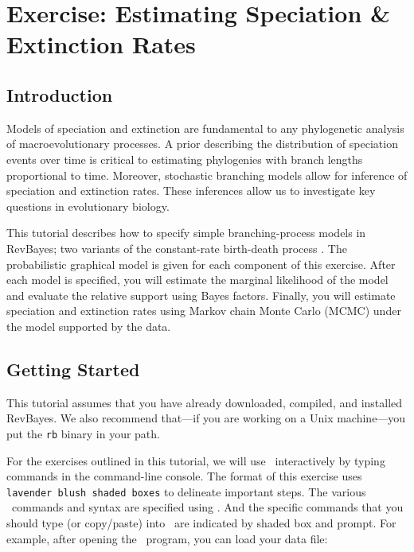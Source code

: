 \section{Exercise: Estimating Speciation \& Extinction Rates}

\subsection{Introduction}

Models of speciation and extinction are fundamental to any phylogenetic analysis of macroevolutionary processes.
A prior describing the distribution of speciation events over time is critical to estimating phylogenies with branch lengths proportional to time.
Moreover, stochastic branching models allow for inference of speciation and extinction rates.
These inferences allow us to investigate key questions in evolutionary biology.

This tutorial describes how to specify simple branching-process models in RevBayes;
two variants of the constant-rate birth-death process \citep{yule24,kendall48,thompson75,nee94,rannala96,yang97b,aldous01,popovic04,Aldous2005,gernhard08,stadler09}.
The probabilistic graphical model is given for each component of this exercise.
After each model is specified, you will estimate the marginal likelihood of the model and evaluate the relative support using Bayes factors.
Finally, you will estimate speciation and extinction rates using Markov chain Monte Carlo (MCMC) under the model supported by the data.


\bigskip
\subsection{Getting Started}


This tutorial assumes that you have already downloaded, compiled, and installed RevBayes. 
We also recommend that---if you are working on a Unix machine---you put the {\tt rb} binary in your path.

For the exercises outlined in this tutorial, we will use \RevBayes~interactively by typing commands in the command-line console.
The format of this exercise uses \colorbox{shadecolor}{\tt lavender blush shaded boxes} to delineate important steps. 
The various \RevBayes~commands and syntax are specified using . 
And the specific commands that you should type (or copy/paste) into \RevBayes~are indicated by shaded box and prompt. For example, after opening the \RevBayes~program, you can load your data file:

